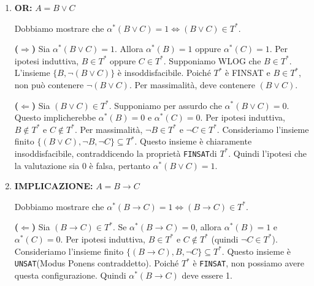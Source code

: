 \documentclass[a4paper,11pt]{report}
\newcommand{\FINSAT}{\texttt{FINSAT}}
\newcommand{\UNSAT}{\texttt{UNSAT}}
\begin{document}
\begin{itemize}
\begin{enumerate}
            \item \textbf{OR: }\( A = B \lor C \)

\vspace{0.5em}
Dobbiamo mostrare che \( \alpha^*(B \lor C) = 1 \iff (B \vee C) \in T^* \).

\vspace{0.5em}
\subitem \textbf{(\(\Rightarrow\))} Sia \( \alpha^*(B \lor C) = 1 \).
Allora \( \alpha^*(B) = 1 \) oppure \( \alpha^*(C) = 1 \).
Per ipotesi induttiva, \( B \in T^* \) oppure \( C \in T^* \).
Supponiamo WLOG che \( B \in T^* \). L'insieme \( \{B, \neg(B \lor C)\} \) è insoddisfacibile. Poiché \( T^* \) è FINSAT e \( B \in T^* \), non può contenere \( \neg(B \lor C) \). Per massimalità, deve contenere \( (B \vee C) \).

\vspace{0.5em}

\subitem \textbf{(\(\Leftarrow\))} Sia \( (B \lor C) \in T^* \).
Supponiamo per assurdo che \( \alpha^*(B \lor C) = 0 \). Questo implicherebbe \( \alpha^*(B)=0 \) e \( \alpha^*(C)=0 \).
Per ipotesi induttiva, \( B \notin T^* \) e \( C \notin T^* \).
Per massimalità, \( \neg B \in T^* \) e \( \neg C \in T^* \).
Consideriamo l'insieme finito \( \{(B \lor C), \neg B, \neg C\} \subseteq T^* \). Questo insieme è chiaramente insoddisfacibile, contraddicendo la proprietà \FINSAT di \( T^* \).
Quindi l'ipotesi che la valutazione sia 0 è falsa, pertanto \( \alpha^*(B \lor C) = 1 \).

\subitem

            \item \textbf{IMPLICAZIONE: }\( A = B \to C\)

\vspace{0.5em}
Dobbiamo mostrare che \( \alpha^*(B \rightarrow C) = 1 \iff (B \rightarrow C) \in T^* \).

\vspace{0.5em}
\subitem \textbf{(\(\Leftarrow\))} Sia \( (B \rightarrow C) \in T^* \).
Se \( \alpha^*(B \rightarrow C) = 0 \), allora \( \alpha^*(B)=1 \) e \( \alpha^*(C)=0 \).
Per ipotesi induttiva, \( B \in T^* \) e \( C \notin T^* \) (quindi \( \neg C \in T^* \)).
Consideriamo l'insieme finito \( \{(B \rightarrow C), B, \neg C\} \subseteq T^* \). Questo insieme è \UNSAT {\color{CadetBlue}(Modus Ponens contraddetto)}.
Poiché \( T^* \) è \FINSAT, non possiamo avere questa configurazione. Quindi \( \alpha^*(B \rightarrow C) \) deve essere 1.

\vspace{0.5em}


\end{enumerate}
\end{itemize}
\end{document}
